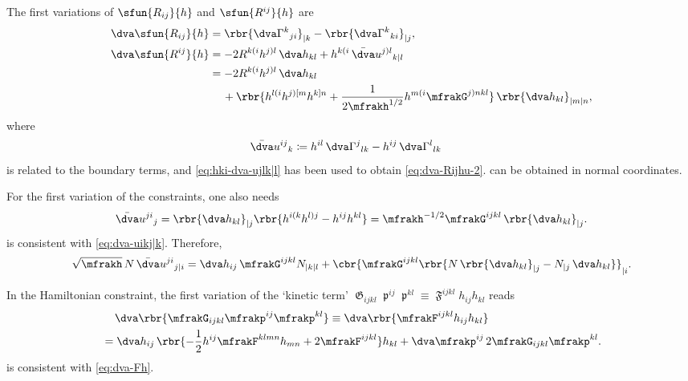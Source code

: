 \documentclass[a4paper,11pt]{article}
\begin{document}
The first variations of $\sfun{R_{ij}}{h}$ and $\sfun{R^{ij}}{h}$ are
\begin{align}
\dva \sfun{R_{ij}}{h} &=
\rbr{\dva\Gamma^k{}_{ji}}_{|k} - \rbr{\dva\Gamma^k{}_{ki}}_{|j},
\label{eq:dva-Rij-low}
\\
\dva \sfun{R^{ij}}{h} &=
-2R^{k(i}h^{j)l}\,\dva h_{kl} + h^{k(i}\,\bar{\dva}u^{j)l}{}_{k|l}
\label{eq:var-Rijhu} \\
&= -2R^{k(i}h^{j)l}\,\dva h_{kl}
\nonumber \\
&\quad\,+
\rbr{h^{l(i}h^{j)[m}h^{k]n}+
\frac{1}{2\mfrakh^{1/2}} h^{m(i}\mfrakG^{j)nkl}}\,\rbr{\dva h_{kl}}_{|m|n},
\label{eq:dva-Rijhu-2}
\end{align}
where
\begin{align}
\bar{\dva}u^{ij}{}_{k} &\coloneqq
h^{il}\,\dva\Gamma^{j}{}_{lk} - h^{ij}\,\dva\Gamma^{l}{}_{lk}
\end{align}
is related to the boundary terms, and \cref{eq:hki-dva-ujlk|l} has been used
to obtain \cref{eq:dva-Rijhu-2}.
 can be obtained in normal coordinates.

For the first variation of the constraints, one also needs
\begin{align}
\bar{\dva}u^{ji}{}_{j} = \rbr{\dva h_{kl}}_{|j}
\rbr{h^{i(k}h^{l)j}-h^{ij}h^{kl}}
= \mfrakh^{-1/2}\mfrakG^{ijkl}\,\rbr{\dva h_{kl}}_{|j}.
\label{eq:dva-ujij}
\end{align}
 is consistent with \cref{eq:dva-uikj|k}.
Therefore, 
\begin{align}
\sqrt{\mfrakh}\,N \,\bar{\dva}u^{ji}{}_{j|i} =
\dva h_{ij}\,\mfrakG^{ijkl}N_{|k|l}
+\cbr{\mfrakG^{ijkl}
\rbr{N\,\rbr{\dva h_{kl}}_{|j} - N_{|j}\,\dva h_{kl}} }_{|i}.
\end{align}

In the Hamiltonian constraint, the first variation of the `kinetic term'
$\mfrakG_{ijkl}\mfrakp^{ij}\mfrakp^{kl} \equiv
\mfrakF^{ijkl}h_{ij}h_{kl}$ reads
\begin{align}
&\quad\,\dva\rbr{ \mfrakG_{ijkl} \mfrakp^{ij}\mfrakp^{kl}}
\equiv \dva\rbr{\mfrakF^{ijkl}h_{ij}h_{kl}}
\\
&=\dva h_{ij}\,\rbr{-\frac{1}{2} h^{ij} \mfrakF^{klmn} h_{mn}
+ 2 \mfrakF^{ijkl} } h_{kl} 
+\dva \mfrakp^{ij}\,2 \mfrakG_{ijkl}\mfrakp^{kl}.
\label{eq:dva-Fhh}
\end{align}
 is consistent with \cref{eq:dva-Fh}.
\end{document}
